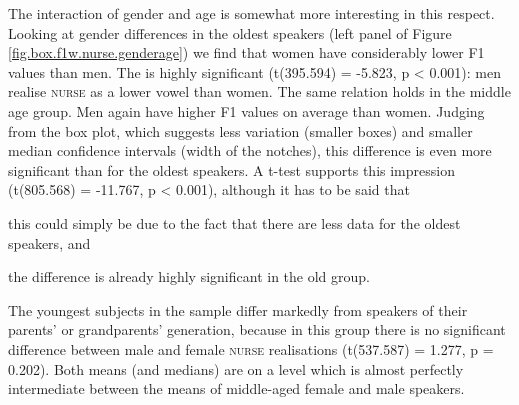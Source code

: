 The interaction of gender and age is somewhat more interesting in this respect.
Looking at gender differences in the oldest speakers (left panel of Figure \ref{fig.box.f1w.nurse.genderage}) we find that women have considerably lower F1 values than men.
The  is highly significant (t(395.594) = -5.823, p < 0.001): men realise \textsc{nurse} as a lower vowel than women.
The same relation holds in the middle age group.
Men again have higher F1 values on average than women.
Judging from the box plot, which suggests less variation (smaller boxes) and smaller median confidence intervals (width of the notches), this difference is even more significant than for the oldest speakers.
A t-test supports this impression (t(805.568) = -11.767, p < 0.001), although it has to be said that
\begin{inparaenum}[(a)]
	\item this could simply be due to the fact that there are less data for the oldest speakers, and
	\item the difference is already highly significant in the old group.
\end{inparaenum}
The youngest subjects in the sample differ markedly from speakers of their parents' or grandparents' generation, because in this group there is no significant difference between male and female \textsc{nurse} realisations (t(537.587) = 1.277, p = 0.202).
Both means (and medians) are on a level which is almost perfectly intermediate between the means of middle-aged female and male speakers.

